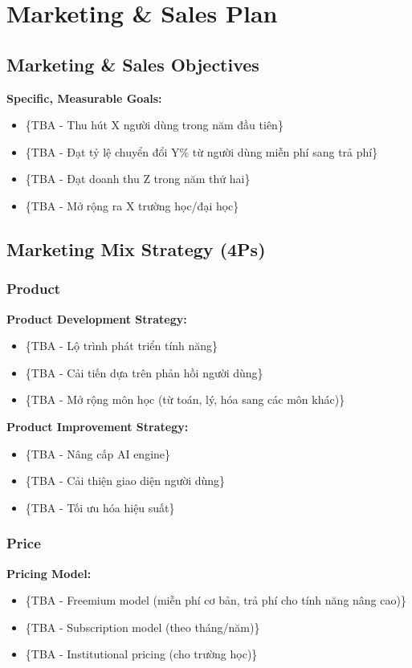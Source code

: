 \section{Marketing \& Sales Plan}

\subsection{Marketing \& Sales Objectives}
\textbf{Specific, Measurable Goals:}
\begin{itemize}
    \item \{TBA - Thu hút X người dùng trong năm đầu tiên\}
    \item \{TBA - Đạt tỷ lệ chuyển đổi Y\% từ người dùng miễn phí sang trả phí\}
    \item \{TBA - Đạt doanh thu Z trong năm thứ hai\}
    \item \{TBA - Mở rộng ra X trường học/đại học\}
\end{itemize}

\subsection{Marketing Mix Strategy (4Ps)}
\subsubsection{Product}
\textbf{Product Development Strategy:}
\begin{itemize}
    \item \{TBA - Lộ trình phát triển tính năng\}
    \item \{TBA - Cải tiến dựa trên phản hồi người dùng\}
    \item \{TBA - Mở rộng môn học (từ toán, lý, hóa sang các môn khác)\}
\end{itemize}

\textbf{Product Improvement Strategy:}
\begin{itemize}
    \item \{TBA - Nâng cấp AI engine\}
    \item \{TBA - Cải thiện giao diện người dùng\}
    \item \{TBA - Tối ưu hóa hiệu suất\}
\end{itemize}

\subsubsection{Price}
\textbf{Pricing Model:}
\begin{itemize}
    \item \{TBA - Freemium model (miễn phí cơ bản, trả phí cho tính năng nâng cao)\}
    \item \{TBA - Subscription model (theo tháng/năm)\}
    \item \{TBA - Institutional pricing (cho trường học)\}
\end{itemize}

